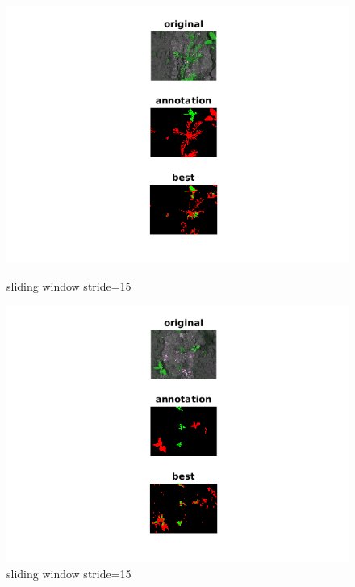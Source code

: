 \documentclass[]{report}
\begin{document}
\begin{figure}[!htb]
  \includegraphics[width=\linewidth]{1.png}
  \caption{sliding window stride=15}\label{fig: sliding window 15 1}
\endminipage\hfill
{}
  \includegraphics[width=\linewidth]{3.png}
  \caption{sliding window stride=15}\label{fig:sliding window 15 2}
\endminipage\hfill
\end{figure}
\end{document}
